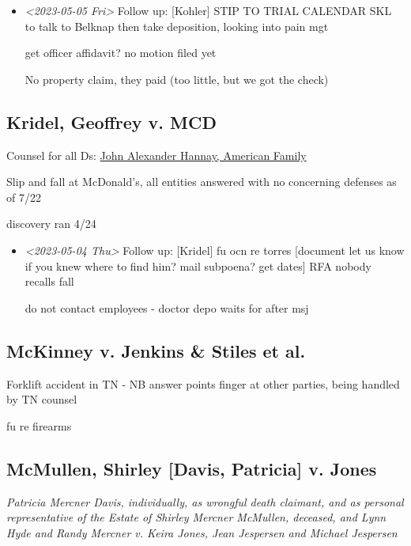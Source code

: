 \documentclass[11pt]{article}
\begin{document}
\begin{itemize}
\item \textit{<2023-05-05 Fri> } Follow up: [Kohler] STIP TO TRIAL CALENDAR SKL to talk to Belknap then take deposition, looking into pain mgt

get officer affidavit? no motion filed yet

No property claim, they paid (too little, but we got the check)
\end{itemize}

\subsection*{Kridel, Geoffrey v. MCD}
\label{sec:org3eaed2b}

Counsel for all Ds: \href{https://www.gabar.org/MemberSearchDetail.cfm?ID=ODg5MDky}{John Alexander Hannay, American Family}

Slip and fall at McDonald's, all entities answered with no concerning defenses as of 7/22

discovery ran 4/24

\begin{itemize}
\item \textit{<2023-05-04 Thu> } Follow up: [Kridel] fu ocn re torres [document let us know if you knew where to find him? mail subpoena? get dates] RFA nobody recalls fall

do not contact employees - doctor depo waits for after msj
\end{itemize}

\subsection*{McKinney v. Jenkins \& Stiles et al.}
\label{sec:orged37448}

Forklift accident in TN - NB answer points finger at other parties, being handled by TN counsel

fu re firearms

\subsection*{McMullen, Shirley [Davis, Patricia] v. Jones}
\label{sec:orgdd25578}

\emph{Patricia Mercner Davis, individually, as wrongful death claimant, and as personal representative of the Estate of Shirley Mercner McMullen, deceased, and Lynn Hyde and Randy Mercner v. Keira Jones, Jean Jespersen and Michael Jespersen}
\end{document}
